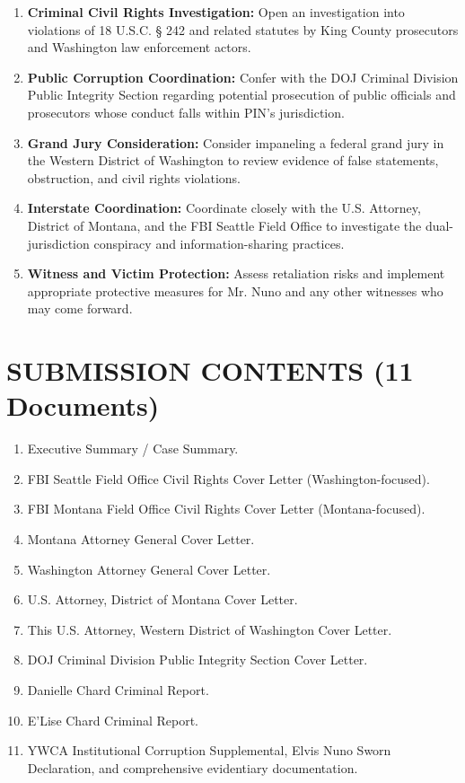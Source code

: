 \documentclass[12pt,oneside]{article}
\begin{document}
\begin{flushleft}
\begin{enumerate}
\item \textbf{Criminal Civil Rights Investigation:} Open an investigation into violations of 18 U.S.C. § 242 and related statutes by King County prosecutors and Washington law enforcement actors.
\item \textbf{Public Corruption Coordination:} Confer with the DOJ Criminal Division Public Integrity Section regarding potential prosecution of public officials and prosecutors whose conduct falls within PIN's jurisdiction.
\item \textbf{Grand Jury Consideration:} Consider impaneling a federal grand jury in the Western District of Washington to review evidence of false statements, obstruction, and civil rights violations.
\item \textbf{Interstate Coordination:} Coordinate closely with the U.S. Attorney, District of Montana, and the FBI Seattle Field Office to investigate the dual-jurisdiction conspiracy and information-sharing practices.
\item \textbf{Witness and Victim Protection:} Assess retaliation risks and implement appropriate protective measures for Mr. Nuno and any other witnesses who may come forward.
\end{enumerate}

\section*{SUBMISSION CONTENTS (11 Documents)}

\begin{enumerate}
\item Executive Summary / Case Summary.
\item FBI Seattle Field Office Civil Rights Cover Letter (Washington-focused).
\item FBI Montana Field Office Civil Rights Cover Letter (Montana-focused).
\item Montana Attorney General Cover Letter.
\item Washington Attorney General Cover Letter.
\item U.S. Attorney, District of Montana Cover Letter.
\item This U.S. Attorney, Western District of Washington Cover Letter.
\item DOJ Criminal Division Public Integrity Section Cover Letter.
\item Danielle Chard Criminal Report.
\item E'Lise Chard Criminal Report.
\item YWCA Institutional Corruption Supplemental, Elvis Nuno Sworn Declaration, and comprehensive evidentiary documentation.
\end{enumerate}


\end{flushleft}
\end{document}
